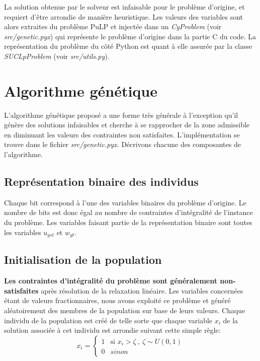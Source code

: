 La solution obtenue par le solveur est infaisable pour le problème d'origine, et requiert d'être arrondie
de manière heuristique. Les valeurs des variables sont alors extraites du problème PuLP et injectée
dans un \textit{CyProblem} (voir \textit{src/genetic.pyx}) qui représente le problème d'origine
dans la partie C du code. La représentation du problème du côté Python est quant à elle assurée
par la classe \textit{SUCLpProblem} (voir \textit{src/utils.py}).

\section{Algorithme génétique}

L'algorithme génétique proposé a une forme très générale à l'exception qu'il génère 
des solutions infaisables et cherche à se rapprocher de la zone admissible en diminuant
les valeurs des contraintes non satisfaites. L'implémentation se trouve dans le fichier 
\textit{src/genetic.pyx}. Décrivons chacune des composantes de l'algorithme.

\subsection{Représentation binaire des individus}
Chaque bit correspond à l'une des variables binaires du problème d'origine.
Le nombre de bits est donc égal au nombre de contraintes d'intégralité de l'instance du problème.
Les variables faisant partie de la représentation binaire sont toutes les variables
$u_{gst}$ et $w_{gt}$.

\subsection{Initialisation de la population}

\textbf{Les contraintes d'intégralité du problème sont généralement non-satisfaites} après résolution
de la relaxation linéaire. Les variables concernées étant de valeurs fractionnaires,
nous avons exploité ce problème et généré aléatoirement des membres de la population
sur base de leurs valeurs. Chaque individu de la population est créé de telle sorte que chaque variable
$x_i$ de la solution associée à cet individu est arrondie suivant cette simple règle:
\begin{equation}
x_i =
\begin{cases}
  1 & \text{si } x_i > \zeta \ , \ \zeta \sim U(0, 1) \\
  0 & sinon
\end{cases}       
\end{equation} \\

